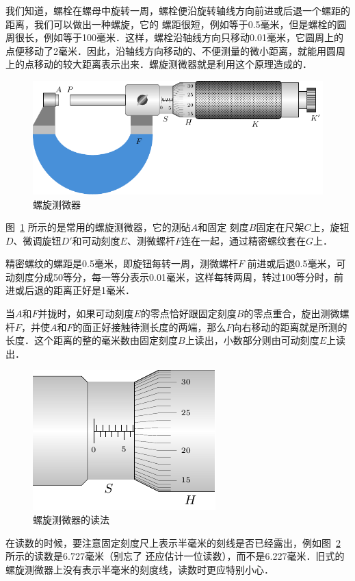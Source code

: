 我们知道，螺栓在螺母中旋转一周，螺栓便沿旋转轴线方向前进或后退一个螺距的距离，我们可以做出一种螺旋，它的	
螺距很短，例如等于0.5毫米，但是螺栓的圆周很长，例如等于100毫米．这样，螺栓沿轴线方向只移动0.01毫米，它圆周上的点便移动了2毫米．因此，沿轴线方向移动的、不便测量的微小距离，就能用圆周上的点移动的较大距离表示出来．螺旋测微器就是利用这个原理造成的．
\begin{figure}[htbp]
    \centering
    \includegraphics{fig/A/10-4.pdf}
    \caption{螺旋测微器}\label{fig_A_10-4}
\end{figure}

图~\ref{fig_A_10-4} 所示的是常用的螺旋测微器，它的测砧$A$和固定
刻度$B$固定在尺架$C$上，旋钮$D$、微调旋钮$D'$和可动刻度$E$、测微螺杆$F$连在一起，通过精密螺纹套在$G$上．

精密螺纹的螺距是0.5毫米，即旋钮每转一周，测微螺杆$F$ 前进或后退0.5毫米，可动刻度分成50等分，每一等分表示0.01毫米，这样每转两周，转过100等分时，前进或后退的距离正好是1毫米．

当$A$和$F$并拢时，如果可动刻度$E$的零点恰好跟固定刻度$B$的零点重合，旋出测微螺杆$F$，并使$A$和$F$的面正好接触待测长度的两端，那么$F$向右移动的距离就是所测的长度．这个距离的整的毫米数由固定刻度$B$上读出，小数部分则由可动刻度$E$上读出．
\begin{figure}[htbp]
    \centering
    \includegraphics{fig/A/10-5.pdf}
    \caption{螺旋测微器的读法}\label{fig_A_10-5}
\end{figure}

在读数的时候，要注意固定刻度尺上表示半毫米的刻线是否已经露出，例如图~\ref{fig_A_10-5} 所示的读数是6.727毫米（别忘了
还应估计一位读数），而不是6.227毫米．旧式的螺旋测微器上没有表示半毫米的刻度线，读数时更应特别小心．

